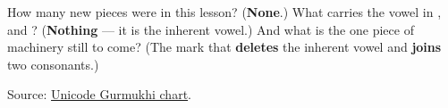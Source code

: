 \begin{tcolorbox}[breakable,colback=teal!4,colframe=teal!35!black,title={Before you move on}]
How many new pieces were in this lesson? (\textbf{None}.) What carries the vowel in \textbf{}, \textbf{} and \textbf{}? (\textbf{Nothing} — it is the inherent vowel.) And what is the one piece of machinery still to come? (The mark that \textbf{deletes} the inherent vowel and \textbf{joins} two consonants.)

Source: \href{https://www.unicode.org/charts/PDF/U0A00.pdf}{Unicode Gurmukhi chart}.
\end{tcolorbox}
